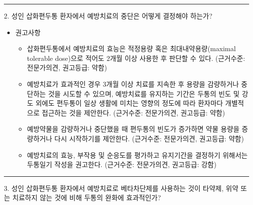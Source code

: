 \documentclass[]{book}
\providecommand{\tightlist}{%
  \setlength{\itemsep}{0pt}\setlength{\parskip}{0pt}}
\begin{document}
\begin{center}\rule{0.5\linewidth}{\linethickness}\end{center}

2. 성인 삽화편두통 환자에서 예방치료의 중단은 어떻게 결정해야 하는가?

\begin{itemize}
\item
  권고사항

  \begin{itemize}
  \tightlist
  \item
    삽화편두통에서 예방치료의 효능은 적정용량 혹은 최대내약용량(maximal tolerable dose)으로 적어도 2개월 이상 사용한 후 판단할 수 있다. (근거수준: 전문가의견, 권고등급: 약함)
  \item
    예방치료가 효과적인 경우 3개월 이상 치료를 지속한 후 용량을 감량하거나 중단하는 것을 시도할 수 있으며, 예방치료를 유지하는 기간은 두통의 빈도 및 강도 외에도 편두통이 일상 생활에 미치는 영향의 정도에 따라 환자마다 개별적으로 접근하는 것을 제안한다. (근거수준: 전문가의견, 권고등급: 약함)
  \item
    예방약물을 감량하거나 중단했을 때 편두통의 빈도가 증가하면 약물 용량을 증량하거나 다시 시작하기를 제안한다. (근거수준: 전문가의견, 권고등급: 약함)
  \item
    예방치료의 효능, 부작용 및 순응도를 평가하고 유지기간을 결정하기 위해서는 두통일기 작성을 권고한다. (근거수준: 전문가의견, 권고등급: 강함)
  \end{itemize}
\end{itemize}

\begin{center}\rule{0.5\linewidth}{\linethickness}\end{center}

3. 성인 삽화편두통 환자에서 예방치료로 베타차단제를 사용하는 것이 타약제, 위약 또는 치료하지 않는 것에 비해 두통의 완화에 효과적인가?
\end{document}
